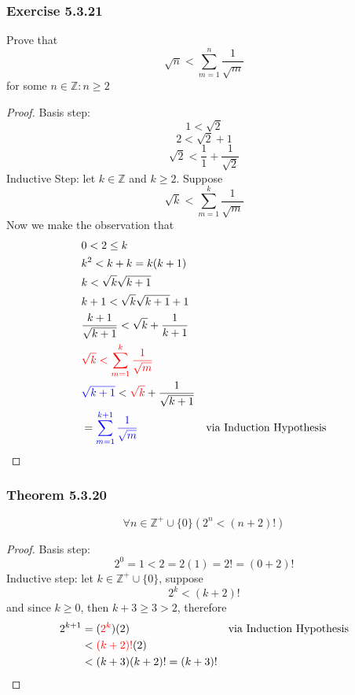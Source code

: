 \documentclass[12pt]{book}
\newcommand{\Z}{\mathbb{Z}}
\newcommand{\paren}[1]{\left( #1 \right)}
\newcommand{\zero}{\{0\}}
\newcommand{\nonneg}{\Z^+ \cup \{0\}}
\begin{document}
\subsubsection{Exercise 5.3.21}
Prove that
\[
\sqrt{n} < \sum_{m=1}^{n} \frac{1}{\sqrt{m}}
\]
for some $n \in \Z : n \geq 2$
\begin{proof}
    Basis step:
    \[
    1< \sqrt{2}
    \]
    \[
    2 < \sqrt{2} + 1
    \]
    \[
    \sqrt{2} < \frac{1}{1} + \frac{1}{\sqrt{2}}
    \]
    Inductive Step: let $k \in \Z$ and $k \geq 2$. Suppose 
    \[
    \sqrt{k} < \sum_{m=1}^{k}\frac{1}{\sqrt{m}}
    \]
    Now we make the observation that
    \begin{align*}
        &0<2\leq k\\
        &k^2 < k+k = k(k+1)\\
        &k < \sqrt{k}\sqrt{k+1}\\
        &k+1 < \sqrt{k}\sqrt{k+1}+1\\
        &\frac{k+1}{\sqrt{k+1}} < \sqrt{k} + \frac{1}{k+1}\\
        & \textcolor{red}{\sqrt{k} < \sum_{m=1}^{k}\frac{1}{\sqrt{m}}}\\
        & \textcolor{blue}{\sqrt{k+1}} < \textcolor{red}{ \sqrt{k} } + \frac{1}{\sqrt{k+1}} \\
        &= \textcolor{blue}{\sum_{m=1}^{k+1}\frac{1}{\sqrt{m}}}
        & \text{via Induction Hypothesis}\\ 
    \end{align*}
    
\end{proof}


\subsubsection{Theorem 5.3.20}
\[
\forall n \in \Z^+ \cup \zero \paren{2^n<(n+2)!}
\]
\begin{proof}
    Basis step:
    \[
    2^0 = 1 < 2 = 2(1) = 2! = (0+2)!
    \]
    Inductive step: let $k \in \nonneg$, suppose
    \[
    2^k < (k+2)!
    \]
    and since $k\geq 0$, then $k+3 \geq 3 > 2$, therefore
    \begin{align*}
        2^{k+1} &= (\textcolor{red}{2^k})(2) & \text{via Induction Hypothesis}\\
        &< \textcolor{red}{(k+2)!}(2)\\
        &<(k+3)(k+2)! = (k+3)!
    \end{align*}
    
\end{proof}
\end{document}
